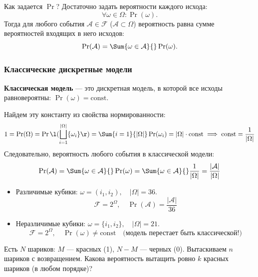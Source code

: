 \begin{exercise}
    Как задается $\Pr$? Достаточно задать вероятности каждого исхода:
    \[
        \forall \omega \in \Omega \colon \Pr(\omega).
    \]
    Тогда для любого события $\mathcal{A} \in \mathcal{F}$
    ($\mathcal{A} \subset \Omega$) вероятность равна сумме
    вероятностей входящих в него исходов:
    \[
        \Pr(\mathcal{A})
        =
        \Sum{\omega \in \mathcal{A}}{} \Pr(\omega).
    \]
    
\end{exercise}

\subsubsection{Классические дискретные модели}

\begin{definition}
    \textbf{Классическая модель} --- это дискретная модель, в которой все исходы равновероятны: $\Pr(\omega) = \text{const}$.
\end{definition}

Найдем эту константу из свойства нормированности:
\[
    1 = \Pr(\Omega) = \Pr\l(\bigsqcup^{|\Omega|}_{i = 1} \{\omega_i\}\r) = \Sum{i = 1}{|\Omega|} \Pr(\omega_i) = |\Omega| \cdot \text{const} \implies \text{const} = \frac{1}{|\Omega|}
\]
Следовательно, вероятность любого события в классической модели:
\[
    \Pr(\mathcal{A}) = \Sum{\omega \in \mathcal{A}}{} \Pr(\omega) = \Sum{\omega \in \mathcal{A}}{} \frac{1}{|\Omega|} = \frac{|\mathcal{A}|}{|\Omega|}
\]

\begin{example}
    \begin{itemize}
        \item Различимые кубики: $\omega = (i_1, i_2), \quad |\Omega| = 36$.
        \[
            \mathcal{F} = 2^{\Omega}, \quad \Pr(\mathcal{A}) = \frac{|\mathcal{A}|}{36}
        \]
        \item Неразличимые кубики: $\omega = \{i_1, i_2\}, \quad |\Omega| = 21$.
        \[
            \mathcal{F} = 2^{\Omega}, \quad \Pr(\omega) \neq \text{const} \quad \text{(модель перестает быть классической!)}
        \]
    \end{itemize}
\end{example}

\begin{task}
    Есть $N$ шариков: $M$ --- красных (1), $N - M$ --- черных (0). 
    Вытаскиваем $n$ шариков с возвращением. Какова вероятность вытащить ровно $k$ красных шариков (в любом порядке)?
\end{task}

